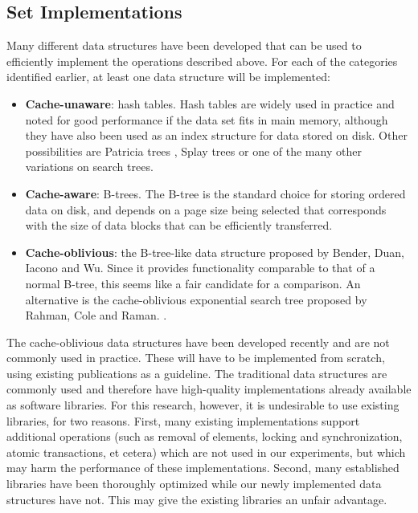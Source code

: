 \documentclass{acm_proc_article-sp}
\begin{document}
\subsection{Set Implementations}
Many different data structures have been developed that can be used to efficiently implement the operations described above. For each of the categories identified earlier, at least one data structure will be implemented:
\begin{itemize}
\item \textbf{Cache-unaware}: hash tables. Hash tables are widely used in practice and noted for good performance if the data set fits in main memory, although they have also been used as an index structure for data stored on disk. Other possibilities are Patricia trees \cite{morrison1968ppa}, Splay trees \cite{sleator1985sab} or one of the many other variations on search trees.
\item \textbf{Cache-aware}: B-trees. The B-tree is the standard choice for storing ordered data on disk, and depends on a page size being selected that corresponds with the size of data blocks that can be efficiently transferred.
\item \textbf{Cache-oblivious}: the B-tree-like data structure proposed by Bender, Duan, Iacono and Wu. Since it provides functionality comparable to that of a normal B-tree, this seems like a fair candidate for a comparison. An alternative is the cache-oblivious exponential search tree proposed by Rahman, Cole and Raman. \cite{rahman2001opd}.
\end{itemize}

The cache-oblivious data structures have been developed recently and are not commonly used in practice. These will have to be implemented from scratch, using existing publications as a guideline. The traditional data structures are commonly used and therefore have high-quality implementations already available as software libraries. For this research, however, it is undesirable to use existing libraries, for two reasons. First, many existing implementations support additional operations (such as removal of elements, locking and synchronization, atomic transactions, et cetera) which are not used in our experiments, but which may harm the performance of these implementations. Second, many established libraries have been thoroughly optimized while our newly implemented data structures have not. This may give the existing libraries an unfair advantage.
\end{document}
